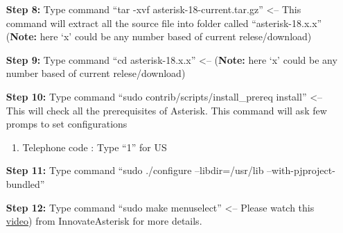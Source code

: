 \begin{itemize}[leftmargin=1.7cm]
			\item[\textbf{Step 8:}] Type command ``tar -xvf asterisk-18-current.tar.gz'' <-- This command will extract all the source file into folder called ``asterisk-18.x.x'' (\textbf{Note:} here `x' could be any number based of current relese/download)
			
			\item[\textbf{Step 9:}] Type command ``cd asterisk-18.x.x'' <-- (\textbf{Note:} here `x' could be any number based of current relese/download)
			
			\item[\textbf{Step 10:}] Type command ``sudo contrib/scripts/install\_prereq install'' <-- This will check all the prerequisites of Asterisk. This command will ask few promps to set configurations
					\begin{enumerate}
						\item Telephone code : Type ``1'' for US
					\end{enumerate}
			\item[\textbf{Step 11:}] Type command ``sudo ./configure --libdir=/usr/lib --with-pjproject-bundled''
			
			\item[\textbf{Step 12:}] Type command ``sudo make menuselect'' <-- Please watch this \href{https://www.youtube.com/watch?v=52sEPVPV9JE&list=PLruX0IBTg1G4Auvo5YhoJKgskmMP7b8bJ&index=4&ab_channel=InnovateAsterisk}{video}) from InnovateAsterisk for more details.


\end{itemize}
